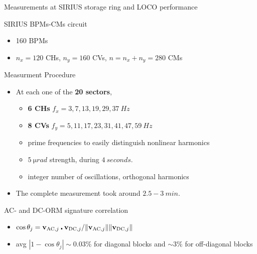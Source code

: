 \documentclass[aspectratio=169]{beamer}
\begin{document}
\begin{frame}{Measurements at SIRIUS storage ring and LOCO performance}
    \begin{minipage}{0.49\textwidth}
        \scriptsize
        SIRIUS BPMs-CMs circuit
        \begin{itemize}
            \item 160 BPMs
            \item $n_x = 120$ CHs, $n_y=160$ CVs, $n=n_x+n_y=280$ CMs
        \end{itemize}
        \pause
        Measurment Procedure
        \begin{itemize}
            \item At each one of the \textbf{20 sectors},
            \begin{itemize}
            \scriptsize
            \item \textbf{6 CHs} $f_x = 3,  7, 13, 19, 29, 37\ \unit{Hz}$
            \item \textbf{8 CVs} $f_y = 5, 11, 17, 23, 31, 41, 47, 59\ \unit{Hz}$
            \item prime frequencies to easily distinguish nonlinear harmonics
            \item $\unit{5~\micro rad}$ strength, during $\unit{4~seconds}$.
            \item integer number of oscillations, orthogonal harmonics
            \end{itemize}
            \item  The complete measurement took around $2.5-3\ \unit{min}$.
        \end{itemize}
    \pause
    AC- and DC-ORM signature correlation
    \pause
    \begin{itemize}
        \scriptsize
        \item $\cos\theta_j = \vb{v}_{\text{AC}, j}\centerdot \vb{v}_{\text{DC}, j}/\norm{\vb{v}_{\text{AC}, j}}\norm{\vb{v}_{\text{DC}, j}}$
        \item avg $|1 - \cos\theta_j|\sim0.03\%$ for diagonal blocks and $\sim3\%$ for off-diagonal blocks
    \end{itemize}
    \end{minipage}
    \pause
    \hfill
    \begin{minipage}{0.49\textwidth}
        \begin{figure}
            \centering

\end{figure}
\end{minipage}
\end{frame}
\end{document}
